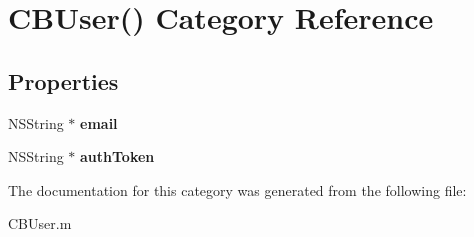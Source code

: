 \hypertarget{category_c_b_user_07_08}{\section{C\+B\+User() Category Reference}
\label{category_c_b_user_07_08}
}
\subsection*{Properties}
\begin{DoxyCompactItemize}
\item 
\hypertarget{category_c_b_user_07_08_a9bdf5fd8da471de347bc15f06e362d2b}{N\+S\+String $\ast$ {\bfseries email}}\label{category_c_b_user_07_08_a9bdf5fd8da471de347bc15f06e362d2b}

\item 
\hypertarget{category_c_b_user_07_08_afb9f1f9c2826ad9a138e63ec3bffe1fc}{N\+S\+String $\ast$ {\bfseries auth\+Token}}\label{category_c_b_user_07_08_afb9f1f9c2826ad9a138e63ec3bffe1fc}

\end{DoxyCompactItemize}


The documentation for this category was generated from the following file\+:\begin{DoxyCompactItemize}
\item 
C\+B\+User.\+m\end{DoxyCompactItemize}
